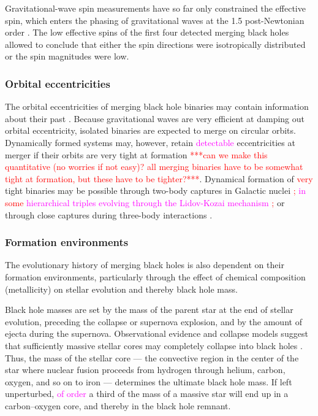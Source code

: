 \documentclass[iop,onecolumn]{revtex4}
\newcommand{\ajf}[1]{\textcolor{red}{#1}}
\newcommand{\ilya}[1]{\textcolor{magenta}{#1}}
\begin{document}
Gravitational-wave spin measurements have so far only constrained the effective spin, which enters the phasing of gravitational waves at the 1.5 post-Newtonian order \citep{PoissonWill:1995}.  The low effective spins of the first four detected merging black holes allowed \citet{Farr:2017} to conclude that either the spin directions were isotropically distributed or the spin magnitudes were low.

\subsubsection{Orbital eccentricities}
	The orbital eccentricities of merging black hole binaries may contain information about their past \citep{MandelOShaughnessy:2010}. Because gravitational waves are very efficient at damping out orbital eccentricity, isolated binaries are expected to merge on circular orbits. Dynamically formed systems may, however, retain \ilya{detectable} eccentricities at merger if their orbits are very tight at formation \ajf{***can we make this quantitative (no worries if not easy)? all merging binaries have to be somewhat tight at formation, but these have to be tighter?***}. Dynamical formation of \ajf{very} tight binaries may be possible  through two-body captures in Galactic nuclei \citep{OLeary:2008} \citep[but see][]{Tsang:2013}\ajf{;} \ilya{in \ajf{some} hierarchical triples evolving through the Lidov-Kozai mechanism \citep[e.g.,][]{AntoniniPerets:2012}}\ajf{;} or through close captures during three-body interactions \citep{Samsing:2014, Rodriguez:2018}. 


\subsubsection{Formation environments}
\label{environ}
The evolutionary history of merging black holes is also dependent on their formation environments, particularly through the effect of chemical composition (metallicity) on stellar evolution and thereby black hole mass.

Black hole masses are set by the mass of the parent star at the end of stellar evolution, preceding the collapse or supernova explosion, and by the amount of ejecta during the supernova. Observational evidence and collapse models suggest that sufficiently massive stellar cores may completely collapse into black holes \citep[for a review, see][]{Mirabel:2016}. Thus, the mass of the stellar core --- the convective region in the center of the star where nuclear fusion proceeds from hydrogen through helium, carbon, oxygen, and so on to iron --- determines the ultimate black hole mass.  If left unperturbed, \ilya{of order} a third of the mass of a massive star will end up in a carbon--oxygen core, and thereby in the black hole remnant.
\end{document}
